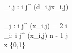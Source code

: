   \sum\limits_{i,j : i \neq j}^{} (d_{i,j}x_{i,j})\\
\\
\sum\limits_{j : i \neq j}^{} (x_{i,j}) =  2 \quad \quad \forall i\\
\sum\limits_{i: i \neq j}^{} (x_{i,j}) \leq n - 1  \quad \quad \forall j\\
x \in \{0,1\}\\
